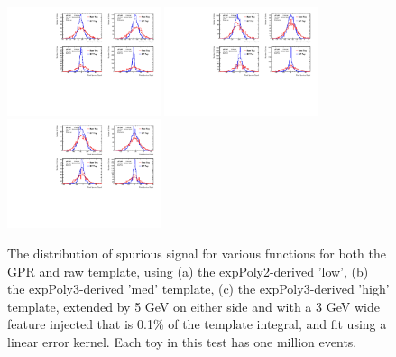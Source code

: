 \begin{figure} 
\begin{center}
  \includegraphics[width=0.4\textwidth]{figures/background/gpr/validation/linear/ToyTest_FitSigVals_lowpT_100_Siginj}   
  \includegraphics[width=0.4\textwidth]{figures/background/gpr/validation/linear/ToyTest_FitSigVals_medpT_100_Siginj}   
  \includegraphics[width=0.4\textwidth]{figures/background/gpr/validation/linear/ToyTest_FitSigVals_highpT_100_Siginj}   
\caption{The distribution of spurious signal for various functions for both the GPR and raw template, using (a) the expPoly2-derived 'low', (b) the expPoly3-derived 'med' template, (c) the expPoly3-derived 'high' template, extended by 5 GeV on either side and with a 3 GeV wide feature injected that is 0.1\% of the template integral, and fit using a linear error kernel. Each toy in this test has one million events.}
\label{fig:linearkernel_lowpt_100_Siginj}
\end{center}
\end{figure}

